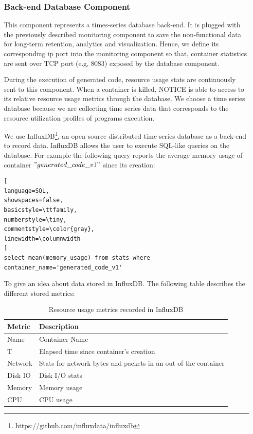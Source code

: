 \subsubsection{Back-end Database Component}
This component represents a times-series database back-end. It is plugged with the previously described monitoring component to save the non-functional data for long-term retention, analytics and visualization. Hence, we define its corresponding ip port into the monitoring component so that, container statistics are sent over TCP port (e.g, 8083) exposed by the database component.

During the execution of generated code, resource usage stats are continuously sent to this component. When a container is killed, NOTICE is able to access to its relative resource usage metrics through the database. We choose a time series database because we are collecting time series data that corresponds to the resource utilization profiles of programs execution.

We use InfluxDB\footnote{https://github.com/influxdata/influxdb}, an open source distributed time series database as a back-end to record data. InfluxDB allows the user to execute SQL-like queries on the database. For example the following query reports the average memory usage of container $"generated\_code\_v1"$ since its creation:

\begin{lstlisting}[
language=SQL,
showspaces=false,
basicstyle=\ttfamily,
numberstyle=\tiny,
commentstyle=\color{gray},
linewidth=\columnwidth
]
select mean(memory_usage) from stats where 
container_name='generated_code_v1'
\end{lstlisting}
To give an idea about data stored in InfluxDB. The following table describes the different stored metrics:
 \begin{table}[h]
 	\begin{center}
 		\begin{tabular}{|p{1cm}|p{6.9cm}|}
 			\hline
 			 \textbf{Metric} & \textbf{Description} \\
 			\hline
 			 Name & Container Name \\
 			\hline
 			 T & Elapsed time since container's creation \\
 			\hline
 			 Network &  Stats for network bytes and packets in an out of the container \\
 			\hline
 			 Disk IO &  Disk I/O stats \\
 			\hline
 			 Memory &  Memory usage \\
 			\hline
 		   	 CPU &  CPU usage \\
 			\hline
 			
 		\end{tabular}
 		
 	\end{center}
 	\caption {Resource usage metrics recorded in InfluxDB}
 \end{table}
 
